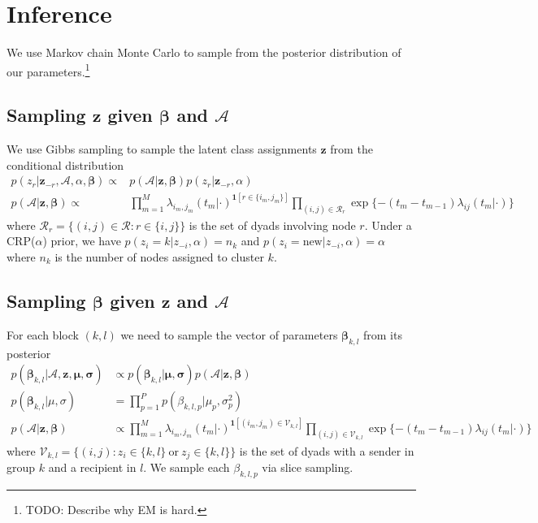 \section{Inference}

We use Markov chain Monte Carlo to sample from the posterior distribution of our parameters.\footnote{TODO: Describe why EM is hard.} %

\subsection{Sampling $\mathbf{z}$ given $\boldsymbol{\beta}$ and $\mathcal{A}$ }

We use Gibbs sampling to sample the latent class assignments $\mathbf{z}$ from the conditional distribution
\begin{align*}
p(z_r | \mathbf{z}_{-r},\mathcal{A},\alpha,\boldsymbol{\beta}) \propto&  p(\mathcal{A}|\mathbf{z},\boldsymbol{\beta}) p(z_r | \mathbf{z}_{-r},\alpha) \\
p(\mathcal{A}|\mathbf{z},\boldsymbol{\beta}) \propto &
\prod_{m=1}^M \lambda_{i_m,j_m}(t_m|\cdot)^{\mathbf{1}[r \in \{i_m,j_m\}]}  \prod_{(i,j) \in \mathcal{R}_r} \exp \{ -(t_m - t_{m-1}) \lambda_{ij}(t_m|\cdot)\}
\end{align*}
where $\mathcal{R}_r = \{(i,j) \in \mathcal{R}: r \in \{i,j\}\}$ is the set of dyads involving node $r$.
Under a CRP($\alpha$) prior, we have $p(z_i = k | z_{-i},\alpha) = n_k $ and $p(z_i = \mbox{new} |  z_{-i},\alpha) = \alpha$ where $n_k$ is the number of nodes assigned to cluster $k$.

\subsection{Sampling $\boldsymbol{\beta}$ given $\mathbf{z}$ and $\mathcal{A}$ }

For each block $(k,l)$ we need to sample the vector of parameters $\boldsymbol{\beta}_{k,l}$ from its posterior
\begin{align*}
p(\boldsymbol{\beta}_{k,l} | \mathcal{A}, \textbf{z}, \boldsymbol{\mu}, \boldsymbol{\sigma}) &\propto p(\boldsymbol{\beta}_{k,l} | \boldsymbol{\mu}, \boldsymbol{\sigma}) p( \mathcal{A}| \textbf{z}, \boldsymbol{\beta}) \\
p(\boldsymbol{\beta}_{k,l} | \mu, \sigma) &= \prod_{p=1}^Pp(\beta_{k,l,p}|\mu_p,\sigma_p^2)\\
p(\mathcal{A}|\mathbf{z},\boldsymbol{\beta}) &\propto \prod_{m=1}^M \lambda_{i_m,j_m}(t_m|\cdot)^{\mathbf{1}[(i_m,j_m) \in \mathcal{V}_{k,l}]}
\prod_{(i,j) \in \mathcal{V}_{k,l}} \exp \{ -(t_m - t_{m-1}) \lambda_{ij}(t_m|\cdot)\}
\end{align*}
where $\mathcal{V}_{k,l} = \{(i,j): z_{i} \in \{k,l\} \ \mbox{or} \ z_{j} \in \{k,l\} \}$ is the set of dyads with a sender in group $k$ and a recipient in $l$.  We sample each $\beta_{k,l,p}$ via slice sampling.

